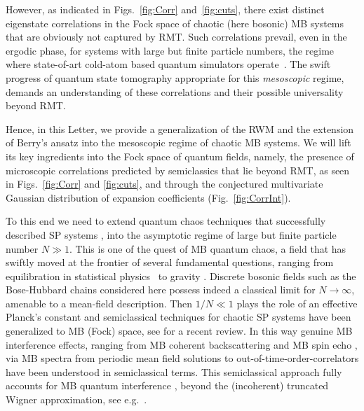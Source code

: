 \documentclass[prl,a4paper,twocolumn,superscriptaddress,floatfix]{revtex4-1}%
\begin{document}
However, as indicated
in Figs.~\ref{fig:Corr} and~\ref{fig:cuts}, there exist distinct eigenstate correlations in the Fock space of chaotic (here bosonic) MB systems that are obviously not captured by RMT. Such correlations prevail, even in the ergodic phase, for systems with large but finite particle numbers, the regime where state-of-art cold-atom based quantum simulators operate~\cite{doi:10.1126/science.aal3837,Aidelsburger_2018,RevModPhys.80.885}. The swift progress of quantum state tomography \cite{Lanyon2017} appropriate for this \emph{mesoscopic} regime, demands an understanding of these correlations and their possible universality beyond RMT.

Hence, in this Letter, we provide a generalization of the RWM and the extension of Berry's ansatz into the mesoscopic regime of chaotic MB systems. We will lift its key ingredients into the Fock space of quantum fields, namely, the presence of microscopic correlations predicted by semiclassics that lie beyond RMT, as seen in
Figs.~\ref{fig:Corr} and \ref{fig:cuts}, and through the conjectured multivariate Gaussian distribution of expansion coefficients (Fig.~\ref{fig:CorrInt}).   

To this end we need to extend quantum chaos techniques that successfully described SP systems \cite{Gutb,Haake06}, into the asymptotic regime of large but finite particle number $N\gg 1$. 
This is one of the quest of MB quantum chaos, a field that has swiftly moved at the frontier of several fundamental questions, ranging from equilibration in statistical physics~\cite{MBQC1,Rig1,MBQC3,Kos2018} to gravity \cite{JT1,JT2}. Discrete bosonic fields such as the Bose-Hubbard chains considered here possess indeed a classical limit for $N\rightarrow \infty$, amenable to a mean-field description. Then 
$1/N \ll 1$ plays the role of an effective Planck's constant and semiclassical techniques for chaotic SP systems have been generalized to MB (Fock) space, see \cite{Richter22} for a recent review.  
In this way genuine MB interference effects, ranging from MB coherent backscattering \cite{CBS} and MB spin echo \cite{MBSE}, via MB spectra from periodic mean field solutions \cite{TF_Thomas,TF_Remy} to
out-of-time-order-correlators \cite{Josef,QB} have been understood in semiclassical terms. This semiclassical approach fully accounts for MB quantum interference \cite{PhysRevA.97.061606}, beyond the (incoherent) truncated Wigner approximation, see e.g.~\cite{PhysRevA.68.053604,pappalardi2020quantum}.

\end{document}

